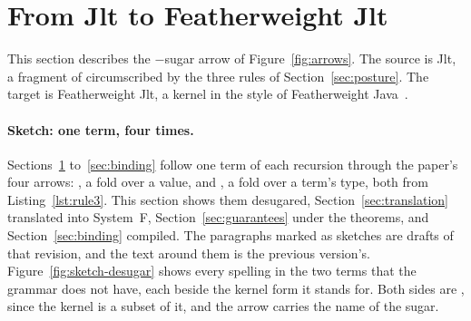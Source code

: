 \section{From Jlt to Featherweight Jlt}
\label{sec:jlt-to-fjlt}

This section describes the $-$sugar arrow of Figure~\ref{fig:arrows}.
The source is Jlt, a fragment of  circumscribed by the three rules of Section~\ref{sec:posture}.
The target is Featherweight Jlt, a kernel in the style of Featherweight Java~\cite{igarashi2001featherweight}.

\paragraph{Sketch: one term, four times.}
Sections~\ref{sec:jlt-to-fjlt} to~\ref{sec:binding} follow one term of each recursion through the paper's four arrows: , a fold over a value, and , a fold over a term's type, both from Listing~\ref{lst:rule3}.
This section shows them desugared, Section~\ref{sec:translation} translated into System~F, Section~\ref{sec:guarantees} under the theorems, and Section~\ref{sec:binding} compiled.
The paragraphs marked as sketches are drafts of that revision, and the text around them is the previous version's.
Figure~\ref{fig:sketch-desugar} shows every spelling in the two terms that the grammar does not have, each beside the kernel form it stands for.
Both sides are \Cpp{}, since the kernel is a subset of it, and the arrow carries the name of the sugar.

